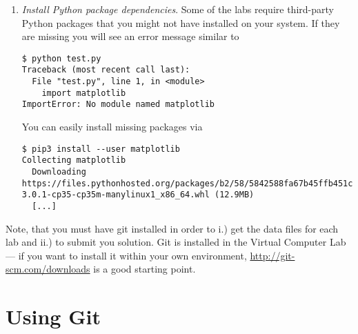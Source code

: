 \begin{enumerate}
\begin{lstlisting}
$ cd username-repo
$ ls -rtl
drwx------ 2 username username 4096 Oct 31 19:48 asg0-tryout

# Record your credentials (has to be done once only).
$ git config --local user.name "Firstname Surname"
$ git config --local user.email "username@student.sdu.dk"
\end{lstlisting}


You can also use SSH for authentification. In this case, you have to follow the instructions linked from the \href{https://docs.gitlab.com/ee/topics/git/clone.html}{GitLab official documentation}. 

\item \emph{Install Python package dependencies}.
\label{step:install-dependencies}
Some of the labs require third-party Python packages that you might not have installed on your system. If they are missing you will see an error message similar to 
\begin{lstlisting}
$ python test.py 
Traceback (most recent call last):
  File "test.py", line 1, in <module>
    import matplotlib
ImportError: No module named matplotlib
\end{lstlisting}

You can easily install missing packages via

\begin{lstlisting}
$ pip3 install --user matplotlib
Collecting matplotlib
  Downloading https://files.pythonhosted.org/packages/b2/58/5842588fa67b45ffb451c4c98eda283c0c42b8f2c5e503e4f6d9ff3c3a63/matplotlib-3.0.1-cp35-cp35m-manylinux1_x86_64.whl (12.9MB)
  [...]
  \end{lstlisting}

\end{enumerate}


Note, that you must have git installed in order to i.) get the data files for each lab and ii.) to submit you solution. Git is installed in the Virtual Computer Lab --- if you want to install it within your own environment, \url{http://git-scm.com/downloads} is a good starting point.

\section*{Using Git} %

